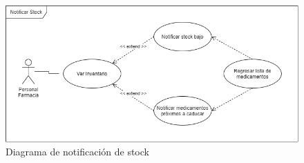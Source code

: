 \documentclass[12pt,letterpaper]{article}
\begin{document}
{\begin{figure}[!htb]
        \end{figure}
        \begin{figure}[!htb]
            \centering
            \includegraphics [scale=0.5]{notStock}
            \caption{Diagrama de notificación de stock}
        \end{figure}
        


			\vfill
	}
\end{document}
